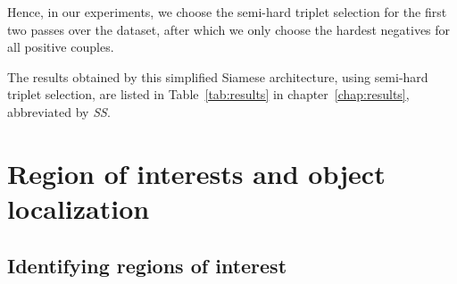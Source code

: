 Hence, in our experiments, we choose the semi-hard triplet selection
for the first two passes over the dataset, after which we only choose
the hardest negatives for all positive couples.

The results obtained by this simplified Siamese architecture, using semi-hard
triplet selection, are listed in Table~\ref{tab:results} in chapter~\ref{chap:results}, abbreviated by \emph{SS}.

\section{Region of interests and object localization}\label{sec:analysisprev}
\subsection{Identifying regions of interest}\label{sec:roi}
